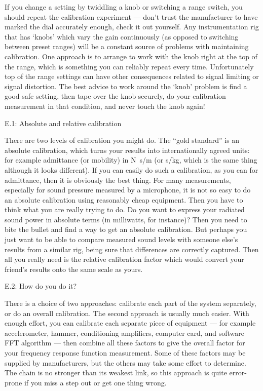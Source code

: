   If you change a setting by twiddling a knob or switching a range switch, you 
  should repeat the calibration experiment — don’t trust the manufacturer to 
  have marked the dial accurately enough, check it out yourself. Any 
  instrumentation rig that has ‘knobs’ which vary the gain continuously (as 
  opposed to switching between preset ranges) will be a constant source of 
  problems with maintaining calibration. One approach is to arrange to work 
  with the knob right at the top of the range, which is something you can 
  reliably repeat every time. Unfortunately top of the range settings can have 
  other consequences related to signal limiting or signal distortion. The best 
  advice to work around the ‘knob’ problem is find a good safe setting, then 
  tape over the knob securely, do your calibration measurement in that 
  condition, and never touch the knob again! 

  E.1: Absolute and relative calibration 

  There are two levels of calibration you might do. The “gold standard” is an 
  absolute calibration, which turns your results into internationally agreed 
  units: for example admittance (or mobility) in N~s/m (or s/kg, which is the 
  same thing although it looks different). If you can easily do such a 
  calibration, as you can for admittance, then it is obviously the best thing. 
  For many measurements, especially for sound pressure measured by a 
  microphone, it is not so easy to do an absolute calibration using reasonably 
  cheap equipment. Then you have to think what you are really trying to do. Do 
  you want to express your radiated sound power in absolute terms (in 
  milliwatts, for instance)? Then you need to bite the bullet and find a way to 
  get an absolute calibration. But perhaps you just want to be able to compare 
  measured sound levels with someone else’s results from a similar rig, being 
  sure that differences are correctly captured. Then all you really need is the 
  relative calibration factor which would convert your friend’s results onto 
  the same scale as yours. 

  E.2: How do you do it? 

  There is a choice of two approaches: calibrate each part of the system 
  separately, or do an overall calibration. The second approach is usually much 
  easier. With enough effort, you can calibrate each separate piece of 
  equipment — for example accelerometer, hammer, conditioning amplifiers, 
  computer card, and software FFT algorithm — then combine all these factors to 
  give the overall factor for your frequency response function measurement. 
  Some of these factors may be supplied by manufacturers, but the others may 
  take some effort to determine. The chain is no stronger than its weakest 
  link, so this approach is quite error-prone if you miss a step out or get one 
  thing wrong. 

